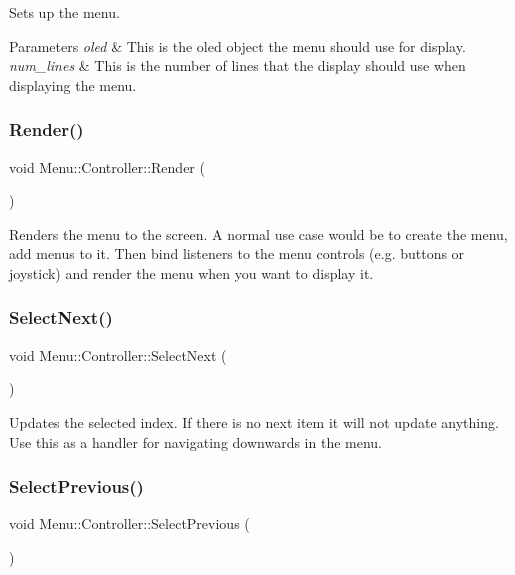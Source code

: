 Sets up the menu. 
\begin{DoxyParams}{Parameters}
{\em oled} & This is the oled object the menu should use for display. \\
\hline
{\em num\+\_\+lines} & This is the number of lines that the display should use when displaying the menu. \\
\hline
\end{DoxyParams}
\hypertarget{class_menu_1_1_controller_af46abb3d242c76822c0e8ea8ab777fa5}{}\label{class_menu_1_1_controller_af46abb3d242c76822c0e8ea8ab777fa5} 
\subsubsection{\texorpdfstring{Render()}{Render()}}
{\footnotesize\ttfamily void Menu\+::\+Controller\+::\+Render (\begin{DoxyParamCaption}{ }\end{DoxyParamCaption})}

Renders the menu to the screen. A normal use case would be to create the menu, add menus to it. Then bind listeners to the menu controls (e.\+g. buttons or joystick) and render the menu when you want to display it. \hypertarget{class_menu_1_1_controller_a9aabc6ba652c29efa7a02e12f51ce0b1}{}\label{class_menu_1_1_controller_a9aabc6ba652c29efa7a02e12f51ce0b1} 
\subsubsection{\texorpdfstring{Select\+Next()}{SelectNext()}}
{\footnotesize\ttfamily void Menu\+::\+Controller\+::\+Select\+Next (\begin{DoxyParamCaption}{ }\end{DoxyParamCaption})}

Updates the selected index. If there is no next item it will not update anything. Use this as a handler for navigating downwards in the menu. \hypertarget{class_menu_1_1_controller_a04e3448cfe4341ad7209a9f16bbcb449}{}\label{class_menu_1_1_controller_a04e3448cfe4341ad7209a9f16bbcb449} 
\subsubsection{\texorpdfstring{Select\+Previous()}{SelectPrevious()}}
{\footnotesize\ttfamily void Menu\+::\+Controller\+::\+Select\+Previous (\begin{DoxyParamCaption}{ }\end{DoxyParamCaption})}

